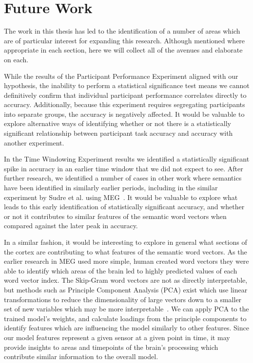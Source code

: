\section{Future Work}

The work in this thesis has led to the identification of a number of areas 
which are of particular interest for expanding this research. Although 
mentioned where appropriate in each section, here we will collect all of the 
avenues and elaborate on each.

While the results of the Participant Performance Experiment aligned with our 
hypothesis, the inability to perform a statistical significance test means we 
cannot definitively confirm that individual participant performance correlates 
directly to \tvt accuracy. Additionally, because this experiment requires 
segregating participants into separate groups, the \tvt accuracy is negatively 
affected. It would be valuable to explore alternative ways of identifying 
whether or not there is a statistically significant relationship between 
participant task accuracy and \tvt accuracy with another experiment.

In the Time Windowing Experiment results we identified a statistically 
significant spike in \tvt accuracy in an earlier time window that we did not 
expect to see. After further research, we identified a number of cases in other 
work where semantics have been identified in similarly earlier periods, 
including in the similar experiment by Sudre et al. using MEG~\cite{Sudre2012}.
It would be valuable to explore what leads to this early identification of 
statistically significant accuracy, and whether or not it contributes to 
similar features of the semantic word vectors when compared against the later 
peak in accuracy.

In a similar fashion, it would be interesting to explore in general what 
sections of the cortex are contributing to what features of the semantic word 
vectors. As the earlier research in MEG used more simple, human created word 
vectors they were able to identify which areas of the brain led to highly 
predicted values of each word vector index. The Skip-Gram word vectors are not 
as directly interpretable, but methods such as Principle Component Analysis 
(PCA) exist which use linear transformations to reduce the dimensionality of 
large vectors down to a smaller set of new variables which may be more 
interpretable~\cite{jolliffe2016principal}. We can apply PCA to the trained 
model's weights, and calculate loadings from the principle components to 
identify features which are influencing the model similarly to other features.  
Since our model features represent a given sensor at a given point in time, it 
may provide insights to areas and timepoints of the brain's processing which 
contribute similar information to the overall model.

